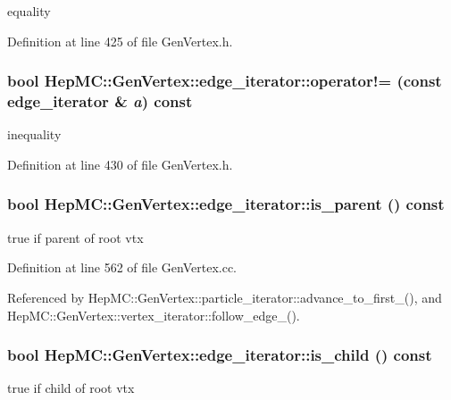 equality 



Definition at line 425 of file Gen\-Vertex.h.
\subsubsection{\setlength{\rightskip}{0pt plus 5cm}bool Hep\-MC::Gen\-Vertex::edge\_\-iterator::operator!= (const {\bf edge\_\-iterator} \& {\em a}) const\hspace{0.3cm}{\tt  [inline]}}\label{classHepMC_1_1GenVertex_1_1edge__iterator_1f0c9b11ad5a900e948ab5eab819e08d}


inequality 



Definition at line 430 of file Gen\-Vertex.h.
\subsubsection{\setlength{\rightskip}{0pt plus 5cm}bool Hep\-MC::Gen\-Vertex::edge\_\-iterator::is\_\-parent () const}\label{classHepMC_1_1GenVertex_1_1edge__iterator_753ee601017931aa8d7c93d35dcecdc9}


true if parent of root vtx 



Definition at line 562 of file Gen\-Vertex.cc.

Referenced by Hep\-MC::Gen\-Vertex::particle\_\-iterator::advance\_\-to\_\-first\_\-(), and Hep\-MC::Gen\-Vertex::vertex\_\-iterator::follow\_\-edge\_\-().
\subsubsection{\setlength{\rightskip}{0pt plus 5cm}bool Hep\-MC::Gen\-Vertex::edge\_\-iterator::is\_\-child () const}\label{classHepMC_1_1GenVertex_1_1edge__iterator_f64456faada4f8de0e4b5e84875ce231}


true if child of root vtx 



